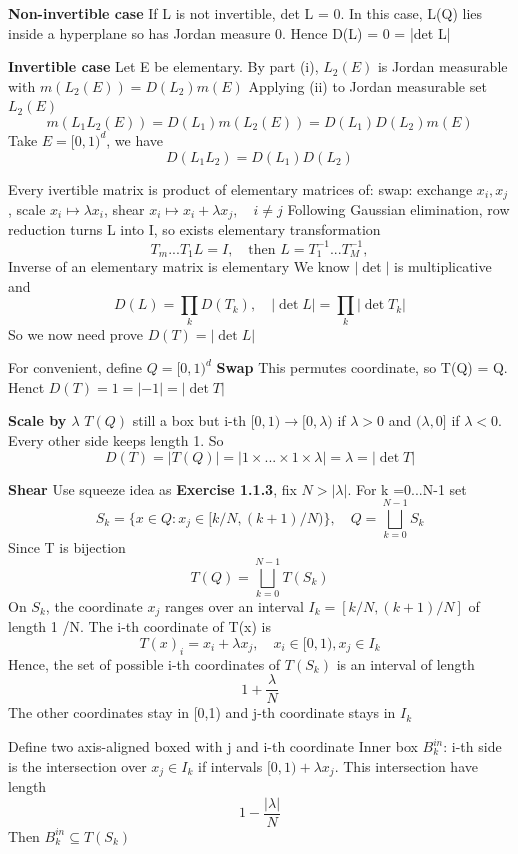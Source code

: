 \textbf{Non-invertible  case}
If L is not invertible, det L = 0. In this case, L(Q) lies inside a hyperplane so has Jordan measure 0. Hence D(L) = 0 = |det L|

\textbf{Invertible case}
Let E be elementary. By part (i), $L_2(E)$ is Jordan measurable with $m(L_2(E)) = D(L_2)m(E)$ 
Applying (ii) to Jordan measurable set $L_2(E)$
\[
m(L_1 L_2 (E)) = D(L_1) m(L_2(E)) = D(L_1) D(L_2) m(E)
\]
Take $E= [0,1)^d$, we have
\begin{equation}
    \label{eq:multiplicative}
    D(L_1L_2) = D(L_1) D(L_2)
\end{equation}

Every ivertible matrix is product of elementary matrices of: swap: exchange $x_i, x_j$, scale $x_i \mapsto \lambda x_i$, shear $x_i \mapsto x_i + \lambda x_j, \quad i \neq j$
Following Gaussian elimination, row reduction turns L into I, so exists elementary transformation
\[
T_m ... T_1 L = I, \quad \text{then } L = T_1^{-1} ... T_M^{-1},
\]
Inverse of an elementary matrix is elementary
We know $|\det|$ is multiplicative and
\[
D(L) = \prod_k D(T_k), \quad |\det L| = \prod_k |\det T_k|
\]
So we now need prove $D(T) = |\det L|$

For convenient, define $Q = [0,1)^d$
\textbf{Swap} This permutes coordinate, so T(Q) = Q. Henct $D(T) = 1 = |-1| = |\det T|$

\textbf{Scale by $\lambda$} $T(Q)$ still a box but i-th $[0,1) \rightarrow [0, \lambda)$ if $\lambda >0 $ and $(\lambda, 0]$ if $\lambda < 0$. Every other side keeps length 1. So
\[
D(T) = |T(Q)| = |1\times...\times 1\times \lambda| = \lambda = |\det T|
\]

\textbf{Shear}
Use squeeze idea as \textbf{Exercise 1.1.3}, fix $N > | \lambda|$. For k =0...N-1 set
\[
S_k = \{ x \in Q: x_j \in [k/N, (k+1) / N)  \}, \quad Q= \bigsqcup_{k=0}^{N-1} S_k
\]
Since T is bijection
\[
T (Q) = \bigsqcup_{k=0}^{N-1}T(S_k)
\]
On $S_k$, the coordinate $x_j$ ranges over an interval $I_k = [k /N, (k+1) / N]$ of length 1 /N. The i-th coordinate of T(x) is
\[
T(x)_i =   x_i + \lambda x_j, \quad x_i \in [0,1), x_j \in I_k
\]
Hence, the set of possible i-th coordinates of $T(S_k)$ is an interval of length
\[
1 + \frac{\lambda}{N}
\]
The other coordinates stay in [0,1) and j-th coordinate stays in $I_k$

Define two axis-aligned boxed with j and i-th coordinate
Inner box $B^{in}_k$: i-th side is the intersection over $x_j \in I_k$ if intervals $[0, 1) + \lambda x_j$. This intersection have length
\[
1 - \frac{|\lambda|}{N}
\]
Then $B^{in}_k \subseteq T(S_k)$

